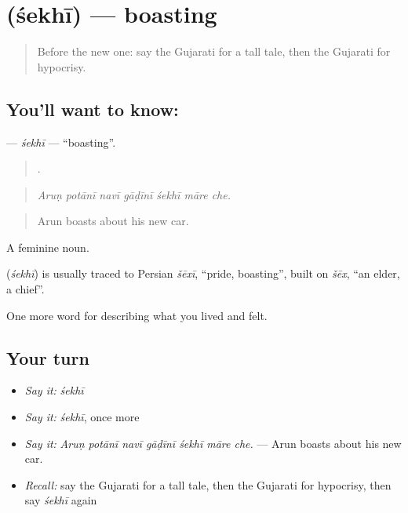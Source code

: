 \section[\texorpdfstring{\gu{શેખી} (śekhī)}{શેખી (śekhī)}]{ (śekhī) — boasting}

\label{lesson:GU-C468-sekhi}



\begin{quote}
Before the new one: say the Gujarati for a tall tale, then the Gujarati for hypocrisy.
\end{quote}

\subsection*{You'll want to know: }
\textbf{} — \emph{śekhī} — \textquotedblleft{}boasting\textquotedblright{}.

\begin{quote}
      .
\end{quote}

\begin{quote}
\emph{Aruṇ potānī navī gāḍīnī śekhī māre che.}
\end{quote}

\begin{quote}
Arun boasts about his new car.
\end{quote}

A feminine noun.

\begin{cousinweb}
\textbf{} (\emph{śekhī}) is usually traced to Persian \emph{šēxī}, \textquotedblleft{}pride, boasting\textquotedblright{}, built on \emph{šēx}, \textquotedblleft{}an elder, a chief\textquotedblright{}.
\end{cousinweb}

\begin{grammarlens}[title={What you've built}]
One more word for describing what you lived and felt.
\end{grammarlens}

\subsection*{Your turn}
\begin{itemize}
\raggedright
  \item \emph{Say it:} \emph{śekhī}
  \item \emph{Say it:} \emph{śekhī}, once more
  \item \emph{Say it:} \emph{Aruṇ potānī navī gāḍīnī śekhī māre che.} — Arun boasts about his new car.
  \item \emph{Recall:} say the Gujarati for a tall tale, then the Gujarati for hypocrisy, then say \emph{śekhī} again
\end{itemize}

